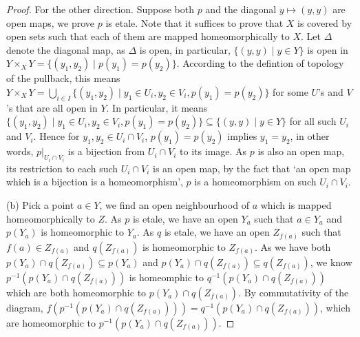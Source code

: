 \documentclass[a4paper]{article}
\begin{document}
\begin{proof}
    For the other direction. Suppose both $p$ and the diagonal $y\mapsto (y,y)$ are open maps, we prove $p$ is etale. Note that it suffices to prove that $X$ is covered by open sets such that each of them are mapped homeomorphically to $X$. Let $\Delta$ denote the diagonal map, as $\Delta$ is open, in particular, $\{(y,y)\mid y\in Y\}$ is open in $Y\times_X Y=\{(y_1,y_2)\mid p(y_1)=p(y_2)\}$. According to the defintion of topology of the pullback, this means $Y\times_X Y=\bigcup_{i\in I}\{(y_1,y_2)\mid y_1\in U_i,y_2\in V_i,p(y_1)=p(y_2)\}$ for some $U$'s and $V$'s that are all open in $Y$. In particular, it means $\{(y_1,y_2)\mid y_1\in U_i,y_2\in V_i,p(y_1)=p(y_2)\}\subseteq \{(y,y)\mid y\in Y\}$ for all such $U_i$ and $V_i$. Hence for $y_1,y_2\in U_i\cap V_i$, $p(y_1)=p(y_2)$ implies $y_1=y_2$, in other words, $p|_{U_i\cap V_i}$ is a bijection from $U_i\cap V_i$ to its image. As $p$ is also an open map, its restriction to each such $U_i\cap V_i$ is an open map, by the fact that `an open map which is a bijection is a homeomorphism', $p$ is a homeomorphism on such $U_i\cap V_i$.

    (b) Pick a point $a\in Y$, we find an open neighbourhood of $a$ which is mapped homeomorphically to $Z$. As $p$ is etale, we have an open $Y_a$ such that $a\in Y_a$ and $p(Y_a)$ is homeomorphic to $Y_a$. As $q$ is etale, we have an open $Z_{f(a)}$ such that $f(a)\in Z_{f(a)}$ and $q(Z_{f(a)})$ is homeomorphic to $Z_{f(a)}$. As we have both $p(Y_a)\cap q(Z_{f(a)})\subseteq p(Y_a)$ and $p(Y_a)\cap q(Z_{f(a)})\subseteq q(Z_{f(a)})$, we know $p^{-1}(p(Y_a)\cap q(Z_{f(a)}))$ is homeomphic to $q^{-1}(p(Y_a)\cap q(Z_{f(a)}))$ which are both homeomorphic to $p(Y_a)\cap q(Z_{f(a)})$. 
    By commutativity of the diagram, $f(p^{-1}(p(Y_a)\cap q(Z_{f(a)})))= q^{-1}(p(Y_a)\cap q(Z_{f(a)}))$, which are homeomorphic to $p^{-1}(p(Y_a)\cap q(Z_{f(a)}))$.
\end{proof}
\end{document}

